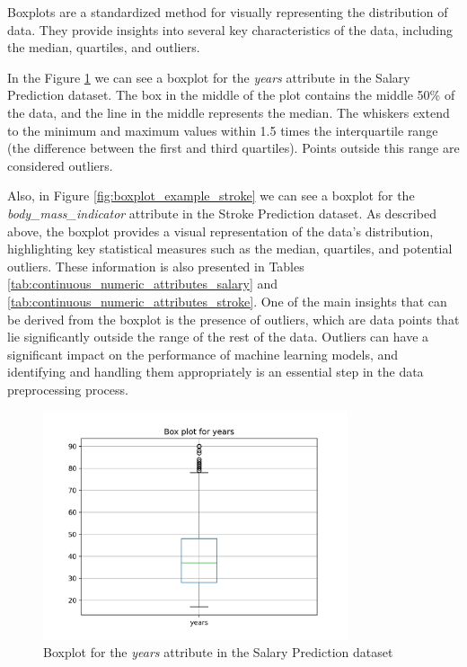 \documentclass[runningheads]{paper}
\begin{document}
Boxplots are a standardized method for visually representing the distribution of
data.  They provide insights into several key characteristics of the data, 
including the median, quartiles, and outliers.

In the Figure \ref{fig:boxplot_example_salary} we can see a boxplot for the 
\textit{years} attribute in the Salary Prediction dataset. The box in the middle
of the plot contains the middle 50\% of the data, and the line in the middle
represents the median. The whiskers extend to the minimum and maximum values
within 1.5 times the interquartile range (the difference between the first and
third quartiles). Points outside this range are considered outliers.

Also, in Figure \ref{fig:boxplot_example_stroke} we can see a boxplot for the
\textit{body\_mass\_indicator} attribute in the Stroke Prediction dataset.
As described above, the boxplot provides a visual representation of the data's
distribution, highlighting key statistical measures such as the median, quartiles,
and potential outliers. These information is also presented in Tables
\ref{tab:continuous_numeric_attributes_salary} and
\ref{tab:continuous_numeric_attributes_stroke}. One of the main insights that
can be derived from the boxplot is the presence of outliers, which are data points
that lie significantly outside the range of the rest of the data. Outliers can
have a significant impact on the performance of machine learning models, and
identifying and handling them appropriately is an essential step in the data
preprocessing process.

\begin{figure}[H]
    \centering
    \includegraphics[width=0.8\textwidth]{../plots/box_plot_years_SalaryPrediction_full.png}
    \caption{Boxplot for the \textit{years} attribute in the Salary Prediction dataset}
    \label{fig:boxplot_example_salary}
\end{figure}
\end{document}
